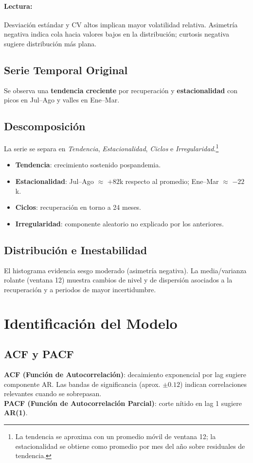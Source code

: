 \documentclass[11pt,a4paper]{article}
\begin{document}
\paragraph{Lectura:} Desviación estándar y CV altos implican mayor volatilidad relativa. Asimetría negativa indica cola hacia valores bajos en la distribución; curtosis negativa sugiere distribución más plana.

\subsection{Serie Temporal Original}
Se observa una \textbf{tendencia creciente} por recuperación y \textbf{estacionalidad} con picos en Jul--Ago y valles en Ene--Mar.

\subsection{Descomposición}
La serie se separa en \textit{Tendencia}, \textit{Estacionalidad}, \textit{Ciclos} e \textit{Irregularidad}.\footnote{La tendencia se aproxima con un promedio móvil de ventana 12; la estacionalidad se obtiene como promedio por mes del año sobre residuales de tendencia.}
\begin{itemize}
  \item \textbf{Tendencia}: crecimiento sostenido pospandemia.
  \item \textbf{Estacionalidad}: Jul--Ago $\approx$ $+82$k respecto al promedio; Ene--Mar $\approx$ $-22$k.
  \item \textbf{Ciclos}: recuperación en torno a 24 meses.
  \item \textbf{Irregularidad}: componente aleatorio no explicado por los anteriores.
\end{itemize}

\subsection{Distribución e Inestabilidad}
El histograma evidencia sesgo moderado (asimetría negativa). La media/varianza rolante (ventana 12) muestra cambios de nivel y de dispersión asociados a la recuperación y a periodos de mayor incertidumbre.

\section{Identificación del Modelo}
\subsection{ACF y PACF}
\textbf{ACF (Función de Autocorrelación)}: decaimiento exponencial por lag sugiere componente AR. Las bandas de significancia (aprox. $\pm0.12$) indican correlaciones relevantes cuando se sobrepasan.\\
\textbf{PACF (Función de Autocorrelación Parcial)}: corte nítido en lag 1 sugiere \textbf{AR(1)}.
\end{document}
